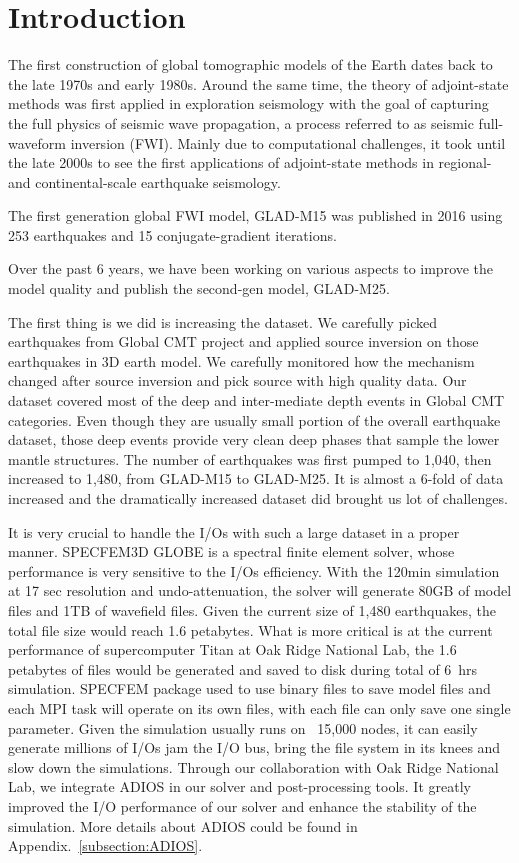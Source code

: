 \chapter{Introduction\label{ch:intro}}

The first construction of global tomographic models of the Earth
dates back to the late 1970s and early 1980s.
Around the same time, the theory of adjoint-state methods was
first applied in exploration seismology with the goal of
capturing the full physics of seismic wave propagation,
a process referred to as seismic full-waveform inversion (FWI).
Mainly due to computational challenges, it took until the late
2000s to see the first applications of adjoint-state methods
in regional- and continental-scale earthquake seismology.

The first generation global FWI model, GLAD-M15\cite{} was published in 2016
using 253 earthquakes and 15 conjugate-gradient iterations.

Over the past 6 years, we have been working on various aspects to improve
the model quality and publish the second-gen model, GLAD-M25.

The first thing is we did is increasing the dataset. We carefully picked
earthquakes from Global CMT project\cite{} and applied source inversion on those
earthquakes in 3D earth model. We carefully monitored how the mechanism changed
after source inversion and pick source with high quality data.
Our dataset covered most of the deep and inter-mediate depth
events in Global CMT categories. Even though they are usually small portion of
the overall earthquake dataset,  those deep events provide very clean deep phases
that sample the lower mantle structures.
The number of earthquakes was first pumped to 1,040, then increased to 1,480,
from GLAD-M15 to GLAD-M25.
It is almost a 6-fold of data increased and the dramatically increased dataset did brought
us lot of challenges.

It is very crucial to handle the I/Os with such a large dataset in a proper manner. 
SPECFEM3D GLOBE is a spectral finite element solver, whose performance is very
sensitive to the I/Os efficiency. With the 120min simulation at 17 sec resolution and 
undo-attenuation, the solver will generate 80GB of model files and 1TB of wavefield files.
Given the current size of 1,480 earthquakes, the total file size would reach 1.6 petabytes.
What is more critical is at the current performance of supercomputer Titan at Oak Ridge
National Lab, the 1.6 petabytes of files would be generated and saved to disk during
total of 6~hrs simulation. SPECFEM package used to use binary files to save model files and each
MPI task will operate on its own files, with each file can only save one single parameter.
Given the simulation usually runs on ~15,000 nodes, it can easily generate millions of I/Os
jam the I/O bus, bring the file system in its knees and slow down the simulations. Through
our collaboration with Oak Ridge National Lab, we integrate ADIOS in our solver and post-processing
tools. It greatly improved the I/O performance of our solver and enhance the stability of the
simulation. More details about ADIOS could be found in Appendix.~\ref{subsection:ADIOS}.


